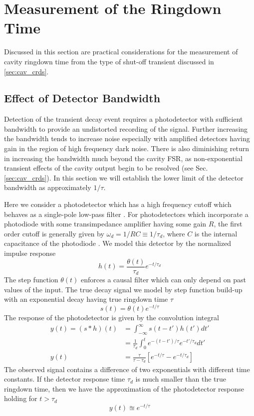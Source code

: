 \documentclass[8pt,a4paper]{report}
\begin{document}
	\section{Measurement of the Ringdown Time}
	Discussed in this section are practical considerations for the measurement of cavity ringdown time from the type of shut-off transient discussed in \ref{sec:cav_crds}.
	
	\subsection{Effect of Detector Bandwidth} \label{sec:crds_detBandwidth}
	Detection of the transient decay event requires a photodetector with sufficient bandwidth to provide an undistorted recording of the signal. Further increasing the bandwidth tends to increase noise especially with amplified detectors having gain in the region of high frequency dark noise. There is also diminishing return in increasing the bandwidth much beyond the cavity FSR, as non-exponential transient effects of the cavity output begin to be resolved (see Sec. \ref{sec:cav_crds}). In this section we will establish the lower limit of the detector bandwidth as approximately $1/\tau$.
	
	Here we consider a photodetector which has a high frequency cutoff which behaves as a single-pole low-pass filter \cite{Su_analogFilters}. For photodetectors which incorporate a photodiode with some transimpedance amplifier having some gain $R$, the first order cutoff is generally given by $\omega_d = 1/RC \equiv 1/\tau_d$, where $C$ is the internal capacitance of the photodiode \cite{Horowitz_ArtOfElectronics}. We model this detector by the normalized impulse response
	\begin{equation}
		h(t) = \frac{\theta(t)}{\tau_d}e^{-t/\tau_d}
	\end{equation}
	The step function $\theta(t)$ enforces a causal filter which can only depend on past values of the input. The true decay signal we model by step function build-up with an exponential decay having true ringdown time $\tau$
	\begin{equation}
		s(t) = \theta(t) e^{-t/\tau}
	\end{equation}
	The response of the photodetector is given by the convolution integral
	\begin{align}
		y(t) = (s*h)(t) &= \int_{-\infty}^{\infty}s(t-t')h(t')dt' \\
		&= \frac{1}{\tau_d}\int_{0}^{t}e^{-(t-t')/\tau}e^{-t'/\tau_d}dt' \\
		y(t) &= \frac{\tau}{\tau - \tau_d}\left[e^{-t/\tau} - e^{-t/\tau_d}\right]
	\end{align}
	The observed signal contains a difference of two exponentials with different time constants. If the detector response time $\tau_d$ is much smaller than the true ringdown time, then we have the approximation of the photodetector response holding for $t>\tau_d$
	\begin{equation}
		y(t) \approxeq e^{-t/\tau}
	\end{equation}
	
\end{document}

